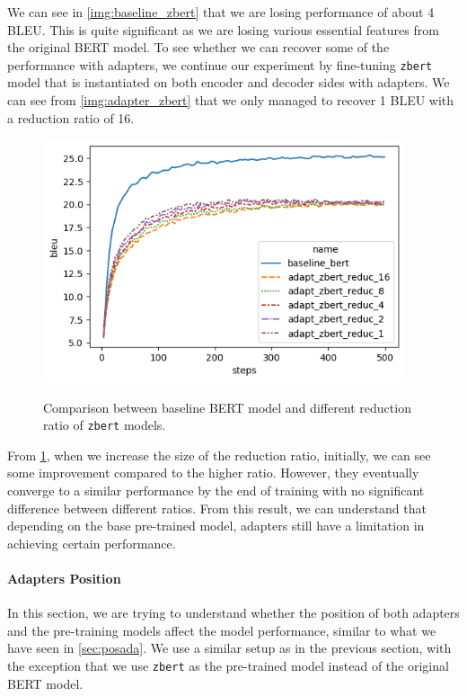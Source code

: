 We can see in \cref{img:baseline_zbert} that we are losing performance of about 4 BLEU. This is quite significant as we are losing various essential features from the original BERT model. To see whether we can recover some of the performance with adapters, we continue our experiment by fine-tuning \texttt{zbert} model that is instantiated on both encoder and decoder sides with adapters. We can see from \cref{img:adapter_zbert} that we only managed to recover 1 BLEU with a reduction ratio of 16.

\begin{figure}[]
    {\includegraphics[width=0.95\textwidth]{img/adapter_zbert_ratio.png}}
    \centering
    \caption{Comparison between baseline BERT model and different reduction ratio of \texttt{zbert} models.}
    \label{img:adapter_zbert_ratio}
\end{figure}

From \cref{img:adapter_zbert_ratio}, when we increase the size of the reduction ratio, initially, we can see some improvement compared to the higher ratio. However, they eventually converge to a similar performance by the end of training with no significant difference between different ratios. From this result, we can understand that depending on the base pre-trained model, adapters still have a limitation in achieving certain performance.

\paragraph{Adapters Position}
In this section, we are trying to understand whether the position of both adapters and the pre-training models affect the model performance, similar to what we have seen in \cref{sec:posada}. We use a similar setup as in the previous section, with the exception that we use \texttt{zbert} as the pre-trained model instead of the original BERT model.

